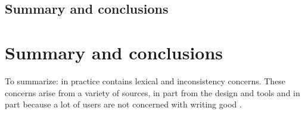 \subsection{}
\subsection{}
\subsection{}
\subsection{}
\subsection{}
\subsection{}
\subsection{}
\subsection{Summary  and conclusions}


\section{Summary and conclusions}

To summarize: in practice {\bibtex} contains lexical and inconsistency
concerns.  These concerns arise from a variety of sources, in part
from the design and tools and in part because a lot of users are not
concerned with writing good {\bibtex}.

